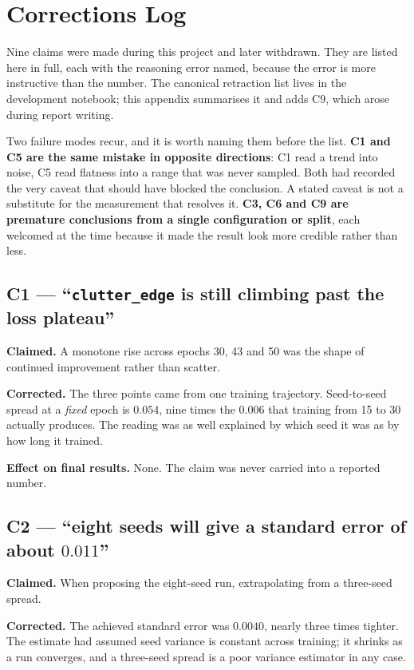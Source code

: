 \chapter{Corrections Log}
\label{app:corrections}

Nine claims were made during this project and later withdrawn. They are listed here in full, each
with the reasoning error named, because the error is more instructive than the number. The canonical
retraction list lives in the development notebook; this appendix summarises it and adds C9, which
arose during report writing.

Two failure modes recur, and it is worth naming them before the list. \textbf{C1 and C5 are the same
mistake in opposite directions}: C1 read a trend into noise, C5 read flatness into a range that was
never sampled. Both had recorded the very caveat that should have blocked the conclusion. A stated
caveat is not a substitute for the measurement that resolves it. \textbf{C3, C6 and C9 are premature
conclusions from a single configuration or split}, each welcomed at the time because it made the
result look more credible rather than less.

\section{C1 --- ``\texttt{clutter\_edge} is still climbing past the loss plateau''}

\textbf{Claimed.} A monotone rise across epochs 30, 43 and 50 was the shape of continued
improvement rather than scatter.

\textbf{Corrected.} The three points came from one training trajectory. Seed-to-seed spread at a
\emph{fixed} epoch is $0.054$, nine times the $0.006$ that training from 15 to 30 actually produces.
The reading was as well explained by which seed it was as by how long it trained.

\textbf{Effect on final results.} None. The claim was never carried into a reported number.

\section{C2 --- ``eight seeds will give a standard error of about $0.011$''}

\textbf{Claimed.} When proposing the eight-seed run, extrapolating from a three-seed spread.

\textbf{Corrected.} The achieved standard error was $0.0040$, nearly three times tighter. The
estimate had assumed seed variance is constant across training; it shrinks as a run converges, and
a three-seed spread is a poor variance estimator in any case.

